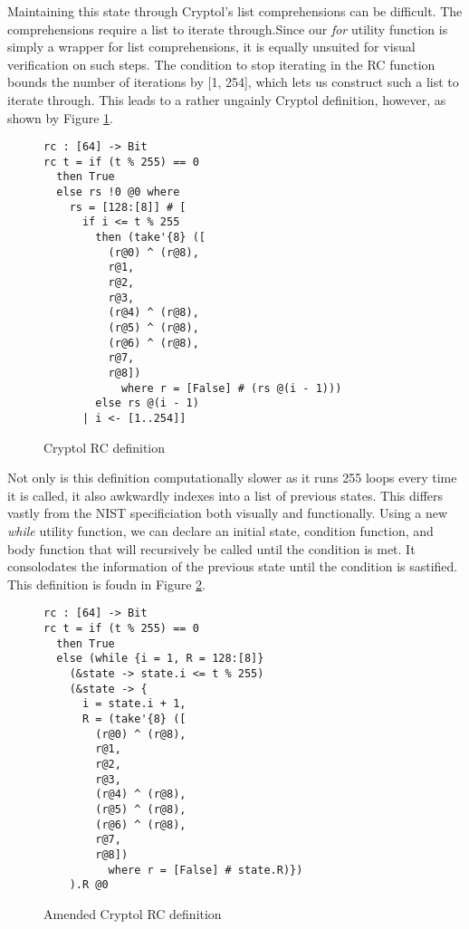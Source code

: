 Maintaining this state through Cryptol's list comprehensions can be difficult.
The comprehensions require a list to iterate through.Since our \emph{for} utility 
function is simply a wrapper for list comprehensions, it is equally unsuited for 
visual verification on such steps. The condition to stop iterating in the RC function
bounds the number of iterations by [1, 254], which lets us construct such a list to 
iterate through. This leads to a rather ungainly Cryptol definition, however, as 
shown by Figure \ref{fig:cryptolRC}.

\begin{figure}[h]
  \centering
\begin{lstlisting}[language=Cryptol]
rc : [64] -> Bit
rc t = if (t % 255) == 0 
  then True 
  else rs !0 @0 where
    rs = [128:[8]] # [
      if i <= t % 255
        then (take'{8} ([
          (r@0) ^ (r@8),
          r@1,
          r@2,
          r@3, 
          (r@4) ^ (r@8),
          (r@5) ^ (r@8),
          (r@6) ^ (r@8),
          r@7,
          r@8])
            where r = [False] # (rs @(i - 1)))
        else rs @(i - 1)
      | i <- [1..254]]
\end{lstlisting}
\caption{Cryptol RC definition}
\label{fig:cryptolRC}
\end{figure}

Not only is this definition computationally slower as it runs 255 loops every time it is called, 
it also awkwardly indexes into a list of previous states. This differs vastly from the 
NIST specificiation both visually and functionally. Using a new \emph{while} utility function, we 
can declare an initial state, condition function, and body function that will recursively 
be called until the condition is met. It consolodates the information of the previous state 
until the condition is sastified. This definition is foudn in Figure \ref{fig:cryptolamendedRC}.

\begin{figure}[h]
  \centering
\begin{lstlisting}[language=Cryptol]
rc : [64] -> Bit
rc t = if (t % 255) == 0 
  then True 
  else (while {i = 1, R = 128:[8]}
    (&state -> state.i <= t % 255)
    (&state -> {
      i = state.i + 1, 
      R = (take'{8} ([
        (r@0) ^ (r@8),
        r@1,
        r@2,
        r@3,
        (r@4) ^ (r@8),
        (r@5) ^ (r@8),
        (r@6) ^ (r@8),
        r@7, 
        r@8]) 
          where r = [False] # state.R)})
    ).R @0
\end{lstlisting}
\caption{Amended Cryptol RC definition}
\label{fig:cryptolamendedRC}
\end{figure}

